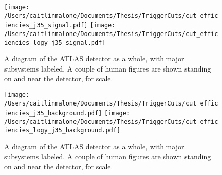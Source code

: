 \begin{figure}
	\texttt{[image: /Users/caitlinmalone/Documents/Thesis/TriggerCuts/cut\_efficiencies\_j35\_signal.pdf]}	
	\texttt{[image: /Users/caitlinmalone/Documents/Thesis/TriggerCuts/cut\_efficiencies\_logy\_j35\_signal.pdf]}	
    \caption{A diagram of the ATLAS detector as a whole, with major subsystems labeled.  A couple of human figures are shown standing on and near the detector, for scale. \label{fig:signal_eff_cutflow}}
\end{figure}






\begin{figure}
	\texttt{[image: /Users/caitlinmalone/Documents/Thesis/TriggerCuts/cut\_efficiencies\_j35\_background.pdf]}	
	\texttt{[image: /Users/caitlinmalone/Documents/Thesis/TriggerCuts/cut\_efficiencies\_logy\_j35\_background.pdf]}	
    \caption{A diagram of the ATLAS detector as a whole, with major subsystems labeled.  A couple of human figures are shown standing on and near the detector, for scale. \label{fig:background_eff_cutflow}}
\end{figure}









